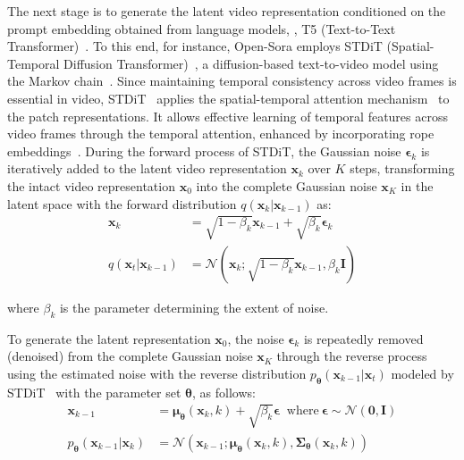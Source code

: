 The next stage is to generate the latent video representation conditioned on the prompt embedding obtained from language models, \eg, T5 (Text-to-Text Transformer)~\cite{raffel2020exploring}. To this end, for instance, Open-Sora employs STDiT (Spatial-Temporal Diffusion Transformer)~\cite{opensora}, a diffusion-based text-to-video model using the Markov chain~\cite{zhang2023text}. Since maintaining temporal consistency across video frames is essential in video, STDiT~\cite{opensora} applies the spatial-temporal attention mechanism~\cite{yan2019stat} to the patch representations. It allows effective learning of temporal features across video frames through the temporal attention, enhanced by incorporating rope embeddings~\cite{su2024roformer}. During the forward process of STDiT, the Gaussian noise $\boldsymbol{\epsilon}_{k}$ is iteratively added to the latent video representation $\mathbf{x}_{k}$ over $K$ steps, transforming the intact video representation $\mathbf{x}_{0}$ into the complete Gaussian noise $\mathbf{x}_{K}$ in the latent space with the forward distribution $q(\mathbf{x}_{k}|\mathbf{x}_{k-1})$ as:
\begin{equation}
\begin{split}
    \mathbf{x}_{k} &= \sqrt{1-\beta_{k}} \mathbf{x}_{k-1} + \sqrt{\beta_{k}} \boldsymbol{\epsilon}_{k}
    \\
    q(\mathbf{x}_t | \mathbf{x}_{k-1}) &= \mathcal{N} (\mathbf{x}_{k} ; \sqrt{1-\beta_{k}} \mathbf{x}_{k-1},\beta_{k} \mathbf{I})    
\end{split}
    \label{eq:forward}
\end{equation}

\noindent where $\beta_{k}$ is the parameter determining the extent of noise. 

To generate the latent representation $\mathbf{x}_{0}$, the noise $\boldsymbol{\epsilon}_{k}$ is repeatedly removed (denoised) from the complete Gaussian noise $\mathbf{x}_{K}$ through the reverse process using the estimated noise with the reverse distribution $p_{\boldsymbol{\theta}}(\mathbf{x}_{k-1}|\mathbf{x}_t)$ modeled by STDiT~\cite{opensora} with the parameter set $\boldsymbol{\theta}$, as follows:
\begin{equation}
\begin{split}
    \mathbf{x}_{k-1} &= \boldsymbol{\mu}_{\boldsymbol{\theta}} (\mathbf{x}_{k}, k) + \sqrt{\beta_{k}} \boldsymbol{\epsilon} ~\text{ where}~ \boldsymbol{\epsilon} \sim \mathcal{N}(\mathbf{0}, \mathbf{I})
    \\
    p_{\boldsymbol{\theta}}(\mathbf{x}_{k-1}|\mathbf{x}_{k}) &= \mathcal{N}(\mathbf{x}_{k-1}; \boldsymbol{\mu}_{\boldsymbol{\theta}} (\mathbf{x}_{k}, k), \boldsymbol{\Sigma}_{\boldsymbol{\theta}} (\mathbf{x}_{k}, k))
\end{split}
    \label{eq:reverse}
\end{equation}

